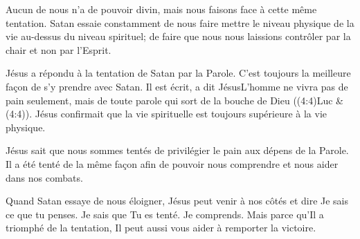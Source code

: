 Aucun de nous n'a de pouvoir divin, mais nous faisons face
 à cette même tentation. Satan essaie constamment de nous faire mettre
 le niveau physique de la vie au-dessus du niveau spirituel;
 de faire que nous nous laissions contrôler 
 par la chair et non par l'Esprit.

Jésus a répondu à la tentation de Satan par la Parole.
 C'est toujours la meilleure fa\c{c}on de s'y prendre avec Satan.
 \Og Il est écrit, a dit Jésus\frcolon L'homme ne vivra pas de pain seulement,
 mais de toute parole qui sort de la bouche de Dieu \Fg{}
 ((4:4)Luc \& (4:4)).
 Jésus confirmait que la vie spirituelle est toujours supérieure
 à la vie physique.


Jésus sait que nous sommes tentés de privilégier le pain aux dépens
 de la Parole. Il a été tenté de la même fa\c{c}on afin de pouvoir 
 nous comprendre et nous aider dans nos combats.

Quand Satan essaye de nous éloigner, Jésus peut venir à nos côtés
 et dire\frcolon{} 
 \Og Je sais ce que tu penses. Je sais que Tu es tenté. Je comprends. \Fg{}
 Mais parce qu'Il a triomphé de la tentation, Il peut aussi vous aider
 à remporter la victoire.

\dvrule


